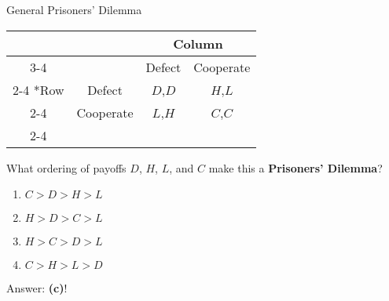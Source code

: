 
\begin{frame}{General Prisoners' Dilemma}
  \begin{table}[!h]
    \centering
    \begin{tabular}{*{4}{c|}}
      \multicolumn{2}{c}{} & \multicolumn{2}{c}{Column} \\ \cline{3-4}
      \multicolumn{1}{c}{} &         & Defect  & Cooperate \\ \cline{2-4}
      \multirow{2}*{Row} &    Defect & $D$,$D$ & $H$,$L$   \\ \cline{2-4}
                         & Cooperate & $L$,$H$ & $C$,$C$   \\ \cline{2-4} 
    \end{tabular} 
  \end{table} 

  What ordering of payoffs $D$, $H$, $L$, and $C$ make this a \textbf{Prisoners' Dilemma}? 
  \begin{enumerate}[label=\textbf{\alph*)}]
    \item $C > D > H > L$ 
    \item $H > D > C > L$ 
    \item $H > C > D > L$ 
    \item $C > H > L > D$
  \end{enumerate}
  \pause 

  Answer: \textbf{(c)}!
\end{frame}


